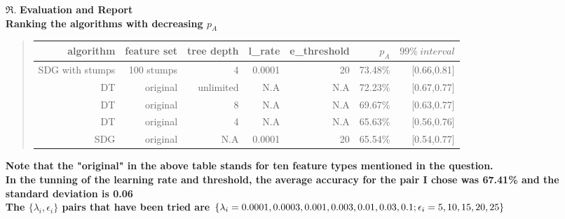 \begin{enumerate}
\begin{enumerate}
	\end{enumerate}
\item[\(\Re\).]\textbf{Evaluation and Report}\\
		\textbf{Ranking the algorithms with decreasing \(p_A\)}
		\begin{quote}
		\begin{tabular}{|r|r|r|r|r|r|r|}
		\hline
		algorithm&feature set&tree depth&l\_rate&e\_threshold&\(p_A\)&\(99\%\ interval\)\\
		\hline
		SDG with stumps&100 stumps&4&0.0001&20&73.48\%&[0.66,0.81]\\
		\hline
		DT&original&unlimited&N.A&N.A&72.23\%&[0.67,0.77]\\
		\hline
		DT&original&8&N.A&N.A&69.67\%&[0.63,0.77]\\
		\hline
		DT&original&4&N.A&N.A&65.63\%&[0.56,0.76]\\
		\hline
		SDG&original&N.A&0.0001&20&65.54\%&[0.54,0.77]\\
		\hline
		\end{tabular}
		\end{quote}
		\textbf{Note that the "original" in the above table stands for ten feature types mentioned in the question.}\\
		\textbf{In the tunning of the learning rate and threshold, the average accuracy for the pair I chose was 67.41\% and the standard deviation is 0.06}\\
		\textbf{The \(\{\lambda_i,\epsilon_i\}\) pairs that have been tried are \(\{\lambda_i=0.0001,0.0003,0.001,0.003,0.01,0.03,0.1;\\\epsilon_i=5,10,15,20,25\}\)}\\



\end{enumerate}
